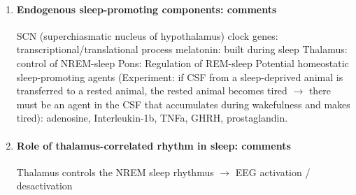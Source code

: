 \documentclass[12pt,article,oneside,a4paper]{memoir}
\begin{document}
\begin{enumerate}
\item \paragraph{Endogenous sleep-promoting components: comments}

SCN (superchiasmatic nucleus of hypothalamus)
	clock genes: transcriptional/translational process
	melatonin: built during sleep
	Thalamus: control of NREM-sleep
	Pons: Regulation of REM-sleep
	Potential homeostatic sleep-promoting agents (Experiment: if CSF from a sleep-deprived animal is transferred to a rested animal, the rested animal becomes tired $\rightarrow$ there must be an agent in the CSF that accumulates during wakefulness and makes tired): adenosine, Interleukin-1b, TNFa, GHRH, prostaglandin.

\item \paragraph{Role of thalamus-correlated rhythm in sleep: comments}

Thalamus controls the NREM sleep rhythmus $\rightarrow$ EEG activation / desactivation
\end{enumerate}
\end{document}
